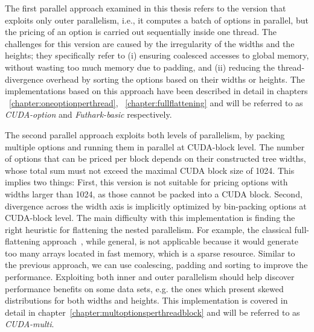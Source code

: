 The first parallel approach examined in this thesis refers to the version that exploits only outer parallelism, i.e., it computes a batch of options in parallel, but the pricing of an option is carried out sequentially inside one thread. The challenges for this version are caused by the irregularity of the widths and the heights; they specifically refer to (i) ensuring coalesced accesses to global memory, without wasting too much memory due to padding, and (ii) reducing the thread-divergence overhead by sorting the options based on their widths or heights. The implementations based on this approach have been described in detail in chapters ~\ref{chapter:oneoptionperthread}, ~\ref{chapter:fullflattening} and will be referred to as \textit{CUDA-option} and \textit{Futhark-basic} respectively.

The second parallel approach exploits both levels of parallelism, by packing multiple options and running them in parallel at CUDA-block level. The number of options that can be priced per block depends on their constructed tree widths, whose total sum must not exceed the maximal CUDA block size of 1024. This implies two things: First, this version is not suitable for pricing options with widths larger than 1024, as those cannot be packed into a CUDA block. Second, divergence across the width axis is implicitly optimized by bin-packing options at CUDA-block level. The main difficulty with this implementation is finding the right heuristic for flattening the nested parallelism.  For example, the classical full-flattening approach~\cite{blelloch1994implementation}, while general, is not applicable because it would generate too many arrays located in fast memory, which is a sparse resource. Similar to the previous approach, we can use coalescing, padding and sorting to improve the performance. Exploiting both inner and outer parallelism should help discover performance benefits on some data sets, e.g. the ones which present skewed distributions for both widths and heights. This implementation is covered in detail in chapter~\ref{chapter:multoptionsperthreadblock} and will be referred to as \textit{CUDA-multi}. 

